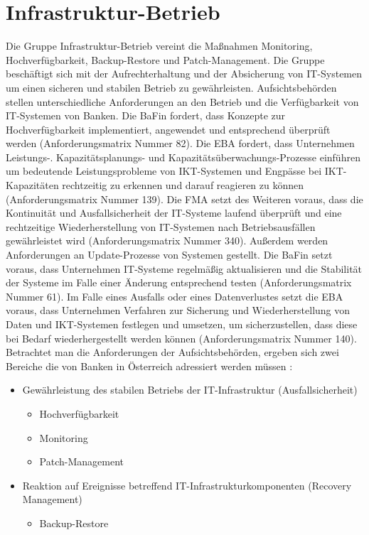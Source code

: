 \section{Infrastruktur-Betrieb}
\label{Patch-Management}
Die Gruppe \glqq{}Infrastruktur-Betrieb\grqq{} vereint die Maßnahmen \glqq{}Monitoring\grqq{}, \glqq{}Hochverfügbarkeit\grqq{}, \glqq{}Backup-Restore\grqq{} und \glqq{}Patch-Management\grqq{}. Die Gruppe beschäftigt sich mit der Aufrechterhaltung und der Absicherung von IT-Systemen um einen sicheren und stabilen Betrieb zu gewährleisten. 
Aufsichtsbehörden stellen unterschiedliche Anforderungen an den Betrieb und die Verfügbarkeit von IT-Systemen von Banken. Die BaFin fordert, dass Konzepte zur Hochverfügbarkeit implementiert, angewendet und entsprechend überprüft werden (Anforderungsmatrix Nummer 82). Die EBA fordert, dass Unternehmen Leistungs-. Kapazitätsplanungs- und Kapazitätsüberwachungs-Prozesse einführen um bedeutende Leistungsprobleme von IKT-Systemen und Engpässe bei IKT-Kapazitäten rechtzeitig zu erkennen und darauf reagieren zu können (Anforderungsmatrix Nummer 139). Die FMA setzt des Weiteren voraus, dass die Kontinuität und Ausfallsicherheit der IT-Systeme laufend überprüft und eine rechtzeitige Wiederherstellung von IT-Systemen nach Betriebsausfällen gewährleistet wird (Anforderungsmatrix Nummer 340). Außerdem werden Anforderungen an Update-Prozesse von Systemen gestellt. Die BaFin setzt voraus, dass Unternehmen IT-Systeme regelmäßig aktualisieren und die Stabilität der Systeme im Falle einer Änderung entsprechend testen (Anforderungsmatrix Nummer 61). Im Falle eines Ausfalls oder eines Datenverlustes setzt die EBA voraus, dass Unternehmen Verfahren zur Sicherung und Wiederherstellung von Daten und IKT-Systemen festlegen und umsetzen, um sicherzustellen, dass diese bei Bedarf wiederhergestellt werden können (Anforderungsmatrix Nummer 140). 
\bigbreak
Betrachtet man die Anforderungen der Aufsichtsbehörden, ergeben sich zwei Bereiche die von Banken in Österreich adressiert werden müssen \autocite{kharod_2021}:
\begin{itemize}
    \item Gewährleistung des stabilen Betriebs der IT-Infrastruktur (Ausfallsicherheit)
    \begin{itemize}
        \item Hochverfügbarkeit
        \item Monitoring
        \item Patch-Management
    \end{itemize}
    \item Reaktion auf Ereignisse betreffend IT-Infrastrukturkomponenten (Recovery Management)
    \begin{itemize}
        \item Backup-Restore
    \end{itemize}
\end{itemize}

